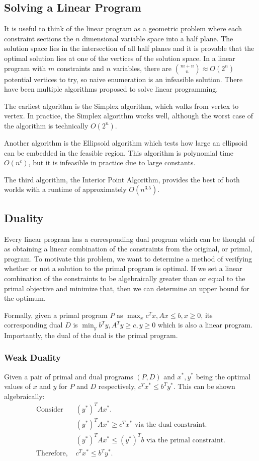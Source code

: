 \documentclass[10pt]{article}
\begin{document}
\subsection*{Solving a Linear Program}
It is useful to think of the linear program as a geometric problem where each constraint sections the $n$ dimensional variable space into a half plane. The solution space lies in the intersection of all half planes and it is provable that the optimal solution lies at one of the vertices of the solution space. In a linear program with $m$ constraints and $n$ variables, there are ${m+n \choose n} \approx O(2^n)$ potential vertices to try, so naive enumeration is an infeasible solution. There have been multiple algorithms proposed to solve linear programming.

The earliest algorithm is the Simplex algorithm, which walks from vertex to vertex. In practice, the Simplex algorithm works well, although the worst case of the algorithm is technically $O(2^n)$.

Another algorithm is the Ellipsoid algorithm which tests how large an ellipsoid can be embedded in the feasible region. This algorithm is polynomial time $O(n^c)$, but it is infeasible in practice due to large constants.

The third algorithm, the Interior Point Algorithm, provides the best of both worlds with a runtime of approximately $O(n^{3.5})$.

\subsection*{Duality}
Every linear program has a corresponding dual program which can be thought of as obtaining a linear combination of the constraints from the original, or primal, program. To motivate this problem, we want to determine a method of verifying whether or not a solution to the primal program is optimal. If we set a linear combination of the constraints to be algebraically greater than or equal to the primal objective and minimize that, then we can determine an upper bound for the optimum.

Formally, given a primal program $P$ as $\max_x c^T x, Ax \leq b, x \geq 0$, its corresponding dual $D$ is $\min_y b^T y, A^T y \geq c, y \geq 0$ which is also a linear program. Importantly, the dual of the dual is the primal program.

\subsubsection*{Weak Duality}
Given a pair of primal and dual programs $(P, D)$ and $x^*, y^*$ being the optimal values of $x$ and $y$ for $P$ and $D$ respectively, $c^T x^* \leq b^T y^*$. This can be shown algebraically:
\begin{align*}
    \text{Consider }&(y^*)^T A x^*.\\
    &(y^*)^T A x^* \geq c^T x^* \text{ via the dual constraint.}\\
    &(y^*)^T A x^* \leq (y^*)^T b \text{ via the primal constraint.}\\
    \text{Therefore, }&c^T x^* \leq b^T y^*.
\end{align*}
\end{document}
